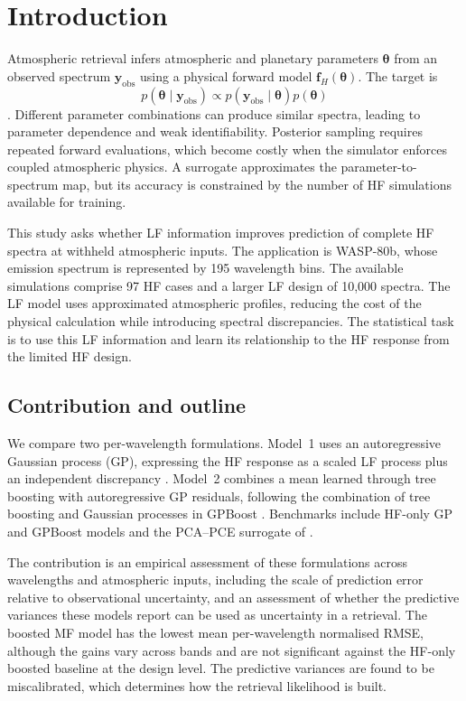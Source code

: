 \documentclass[12pt, letterpaper, oneside]{article}
\begin{document}
\thispagestyle{firstpage}
\pagebreak
\newgeometry{}

\section{Introduction}
\label{sec:intro}

Atmospheric retrieval infers atmospheric and planetary parameters
$\bm\theta$ from an observed spectrum $\mathbf y_{\mathrm{obs}}$ using a
physical forward model $\mathbf f_H(\bm\theta)$. The target is
\[
p(\bm\theta\mid\mathbf y_{\mathrm{obs}})
\propto p(\mathbf y_{\mathrm{obs}}\mid\bm\theta)p(\bm\theta)
\]
\citep{BarstowHeng2020}. Different parameter combinations can produce
similar spectra, leading to parameter dependence and weak identifiability.
Posterior sampling requires repeated forward evaluations, which become
costly when the simulator enforces coupled atmospheric physics. A surrogate
approximates the parameter-to-spectrum map, but its accuracy is constrained
by the number of HF simulations available for training.

This study asks whether LF information improves prediction of complete HF
spectra at withheld atmospheric inputs. The application is WASP-80b, whose
emission spectrum is represented by 195 wavelength bins. The available
simulations comprise 97 HF cases and a larger LF design of 10{,}000 spectra.
The LF model uses approximated atmospheric profiles, reducing the cost of
the physical calculation while introducing spectral discrepancies. The
statistical task is to use this LF information and learn its relationship to
the HF response from the limited HF design.

\subsection{Contribution and outline}

We compare two per-wavelength formulations. Model~1 uses an autoregressive
Gaussian process (GP), expressing the HF response as a scaled LF process
plus an independent discrepancy \citep{KennedyOHagan2000}. Model~2 combines
a mean learned through tree boosting with autoregressive GP residuals,
following the combination of tree boosting and Gaussian processes in GPBoost
\citep{Sigrist2022gpboosting}. Benchmarks include HF-only GP and GPBoost
models and the PCA--PCE surrogate of \citet{Nussbaumer2026}.

The contribution is an empirical assessment of these formulations across
wavelengths and atmospheric inputs, including the scale of prediction error
relative to observational uncertainty, and an assessment of whether the
predictive variances these models report can be used as uncertainty in a
retrieval. The boosted MF model has the lowest mean per-wavelength
normalised RMSE, although the gains vary across bands and are not
significant against the HF-only boosted baseline at the design level. The
predictive variances are found to be miscalibrated, which determines how
the retrieval likelihood is built.
\end{document}
